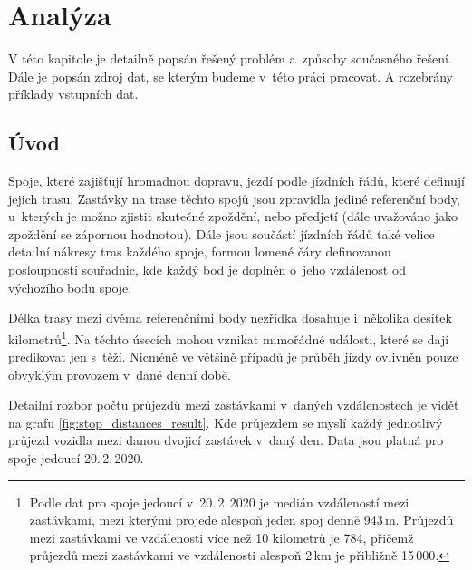 
\chapter{Analýza}

V této kapitole je detailně popsán řešený problém a~způsoby současného řešení. Dále je popsán zdroj dat, se kterým budeme v~této práci pracovat. A rozebrány příklady vstupních dat.

\section{Úvod}

Spoje, které zajišťují hromadnou dopravu, jezdí podle jízdních řádů, které definují jejich trasu. Zastávky na trase těchto spojů jsou zpravidla jediné referenční body, u~kterých je možno zjistit skutečné zpoždění, nebo předjetí (dále uvažováno jako zpoždění se zápornou hodnotou). Dále jsou součástí jízdních řádů také velice detailní nákresy tras každého spoje, formou lomené čáry definovanou posloupností souřadnic, kde každý bod je doplněn o~jeho vzdálenost od výchozího bodu spoje.

\bigbreak

Délka trasy mezi dvěma referenčními body nezřídka dosahuje i~několika desítek kilometrů\footnote{Podle dat pro spoje jedoucí v~20.\,2.\,2020 je medián vzdáleností mezi zastávkami, mezi kterými projede alespoň jeden spoj denně 943\,m. Průjezdů mezi zastávkami ve vzdálenosti více než 10 kilometrů je 784, přičemž průjezdů mezi zastávkami ve vzdálenosti alespoň 2\,km je přibližně 15\,000.}. Na těchto úsecích mohou vznikat mimořádné události, které se dají predikovat jen s~těží. Nicméně ve většině případů je průběh jízdy ovlivněn pouze obvyklým provozem v~dané denní době.

\bigbreak

Detailní rozbor počtu průjezdů mezi zastávkami v~daných vzdálenostech je vidět na grafu \ref{fig:stop_distances_result}. Kde průjezdem se myslí každý jednotlivý průjezd vozidla mezi danou dvojicí zastávek v~daný den. Data jsou platná pro spoje jedoucí 20.\,2.\,2020.

